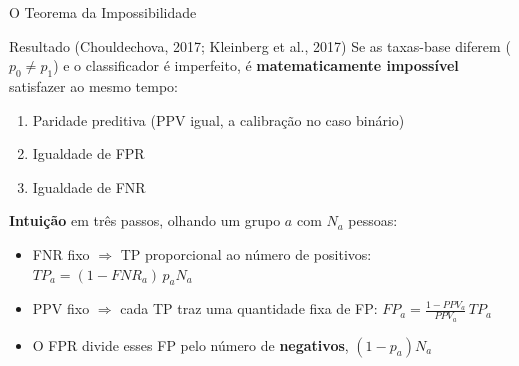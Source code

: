 \documentclass[aspectratio=169,xcolor=dvipsnames]{beamer}
\begin{document}
  \begin{frame}{O Teorema da Impossibilidade}
    \begin{block}{Resultado (Chouldechova, 2017; Kleinberg et al., 2017)}
      Se as taxas-base diferem ($p_0 \neq p_1$) e o classificador é imperfeito, é \textbf{matematicamente impossível} satisfazer ao mesmo tempo:
      \begin{enumerate}
        \item Paridade preditiva (PPV igual, a calibração no caso binário)
        \item Igualdade de FPR
        \item Igualdade de FNR
      \end{enumerate}
    \end{block}

    \nocite{kleinberg2017inherent}%
    \vspace{0.1em}
    \textbf{Intuição} em três passos, olhando um grupo $a$ com $N_a$ pessoas:
    \begin{itemize}\setlength{\itemsep}{0.15em}
      \item FNR fixo $\Rightarrow$ TP proporcional ao número de positivos: $TP_a = (1-FNR_a)\, p_a N_a$
      \item PPV fixo $\Rightarrow$ cada TP traz uma quantidade fixa de FP: $FP_a = \frac{1-PPV_a}{PPV_a}\, TP_a$
      \item O FPR divide esses FP pelo número de \textbf{negativos}, $(1-p_a)N_a$
    \end{itemize}
  \end{frame}
\end{document}
